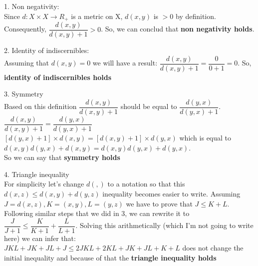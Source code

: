 \documentclass[11pt,a4paper,english]{article}
\begin{document}
\begin{enumerate}
\begin{enumerate}
                    \vspace{3mm}
                    1. Non negativity:\\
                    Since $d:X \times X \rightarrow R_+$ is a metric on X, $d(x,y)$ is $>0$
                    by definition. Consequently, \begin{math} \dfrac{d(x,y)}{d(x,y)+1} > 0\end{math}.
                    So, we can conclud that \textbf{non negativity holds}.

                    \vspace{3mm}
                    2. Identity of indiscernibles:\\
                    Assuming that $d(x,y)=0$ we will have a result: $\dfrac{d(x,y)}{d(x,y)+1} = \dfrac{0}{0+1}=0$. So,
                    \textbf{identity of indiscernibles holds}

                    \vspace{3mm}
                    3. Symmetry\\
                    Based on this definition $\dfrac{d(x,y)}{d(x, y) + 1}$ should be equal to $\dfrac{d(y,x)}{d(y,x)+1}$.\\
                    $\dfrac{d(x,y)}{d(x, y) + 1}=\dfrac{d(y,x)}{d(y,x)+1}$\\
                    $[d(y,x)+1] \times d(x,y) = [d(x, y) + 1] \times d(y,x)$ which is equal to\\
                    $d(x,y)d(y,x)+d(x,y) = d(x,y)d(y,x) + d(y,x)$.\\
                    So we can say that \textbf{symmetry holds}

                    \vspace{3mm}
                    4. Triangle inequality\\
                    For simplicity let's change $d(,)$ to a notation so that this $d(x,z)\leq d(x,y)+d(y,z)$ inequality
                    becomes easier to write. Assuming $J=d(x,z), K=(x,y), L=(y,z)$ we have to prove that $J \leq K + L$.
                    Following similar steps that we did in $3$, we can rewrite it to
                    $\dfrac{J}{J+1} \leq \dfrac{K}{K+1} + \dfrac{L}{L +1}$.
                    Solving this arithmetically (which I'm not going to write here) we can infer that:\\
                    $JKL+JK+JL+J \leq 2JKL+2KL+JK+JL+K+L$ does not change the initial inequality and because of that the
                    \textbf{triangle inequality holds}


\end{enumerate}
\end{enumerate}
\end{document}
